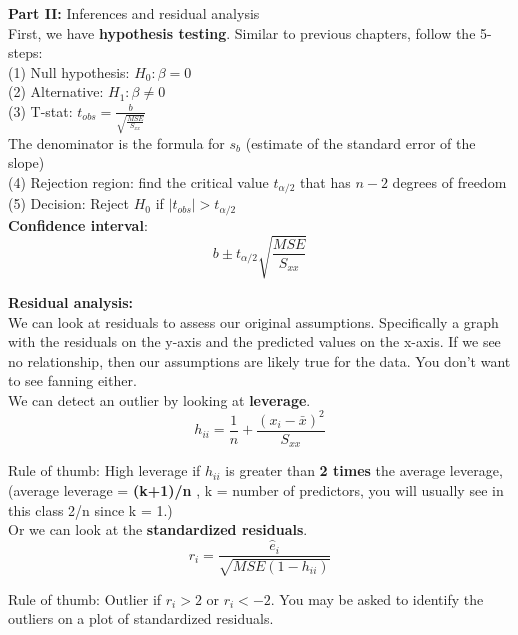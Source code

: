 \documentclass[12pt]{article}
\begin{document}
\noindent \textbf{Part II:} Inferences and residual analysis \\

First, we have \textbf{hypothesis testing}. Similar to previous chapters, follow the 5-steps:\\

(1) Null hypothesis: $H_0: \beta =0$\\

(2) Alternative: $H_1: \beta \neq 0$\\

(3) T-stat: $t_{obs} = \frac{b}{\sqrt{\frac{MSE}{S_{xx}}}}$\\
The denominator is the formula for $s_b$ (estimate of the standard error of the slope)\\

(4) Rejection region: find the critical value $t_{\alpha/2}$ that has $n-2$ degrees of freedom\\

(5) Decision: Reject $H_0$ if $|t_{obs}| > t_{\alpha/2}$\\

\textbf{Confidence interval}:
$$b \pm t_{\alpha/2}\sqrt{\frac{MSE}{S_{xx}}}$$

\textbf{Residual analysis:}\\

We can look at residuals to assess our original assumptions. Specifically a graph with the residuals on the y-axis and the predicted values on the x-axis. If we see no relationship, then our assumptions are likely true for the data. You don't want to see fanning either. \\

We can detect an outlier by looking at \textbf{leverage}.
$$h_{ii} = \frac{1}{n} + \frac{(x_i-\bar{x})^2}{S_{xx}}$$

Rule of thumb: High leverage if $h_{ii}$ is greater than \textbf{2 times} the average leverage, (average leverage = \textbf{(k+1)/n} , k = number of predictors, you will usually see in this class 2/n since k = 1.)\\

Or we can look at the \textbf{standardized residuals}.
$$r_i = \frac{\hat{e}_i}{\sqrt{MSE(1-h_{ii})}}$$

Rule of thumb: Outlier if $r_i > 2$ or $r_i < -2$. You may be asked to identify the outliers on a plot of standardized residuals. 
\end{document}
